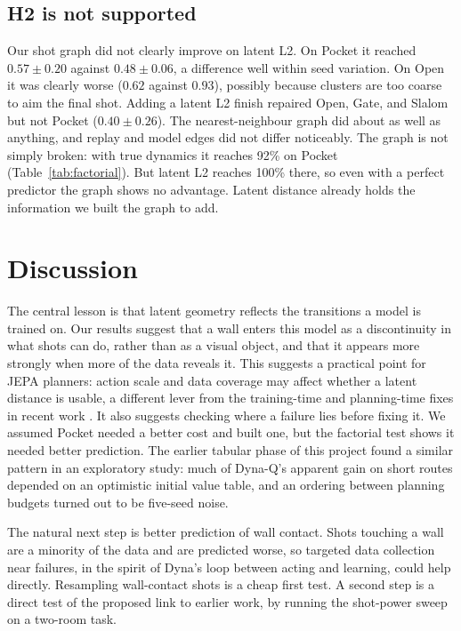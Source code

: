 \documentclass[10pt,twocolumn]{article}
\begin{document}
\subsection{H2 is not supported}
Our shot graph did not clearly improve on latent L2. On Pocket it reached $0.57\pm0.20$ against $0.48\pm0.06$, a difference well within seed variation. On Open it was clearly worse ($0.62$ against $0.93$), possibly because clusters are too coarse to aim the final shot. Adding a latent L2 finish repaired Open, Gate, and Slalom but not Pocket ($0.40\pm0.26$). The nearest-neighbour graph did about as well as anything, and replay and model edges did not differ noticeably. The graph is not simply broken: with true dynamics it reaches 92\% on Pocket (Table~\ref{tab:factorial}). But latent L2 reaches 100\% there, so even with a perfect predictor the graph shows no advantage. Latent distance already holds the information we built the graph to add.

\section{Discussion}
The central lesson is that latent geometry reflects the transitions a model is trained on. Our results suggest that a wall enters this model as a discontinuity in what shots can do, rather than as a visual object, and that it appears more strongly when more of the data reveals it. This suggests a practical point for JEPA planners: action scale and data coverage may affect whether a latent distance is usable, a different lever from the training-time and planning-time fixes in recent work \cite{you2026ngc,hu2026scale,li2026trm,wang2026straightening}. It also suggests checking where a failure lies before fixing it. We assumed Pocket needed a better cost and built one, but the factorial test shows it needed better prediction. The earlier tabular phase of this project found a similar pattern in an exploratory study: much of Dyna-Q's apparent gain on short routes depended on an optimistic initial value table, and an ordering between planning budgets turned out to be five-seed noise.

The natural next step is better prediction of wall contact. Shots touching a wall are a minority of the data and are predicted worse, so targeted data collection near failures, in the spirit of Dyna's loop between acting and learning, could help directly. Resampling wall-contact shots is a cheap first test. A second step is a direct test of the proposed link to earlier work, by running the shot-power sweep on a two-room task.
\end{document}
